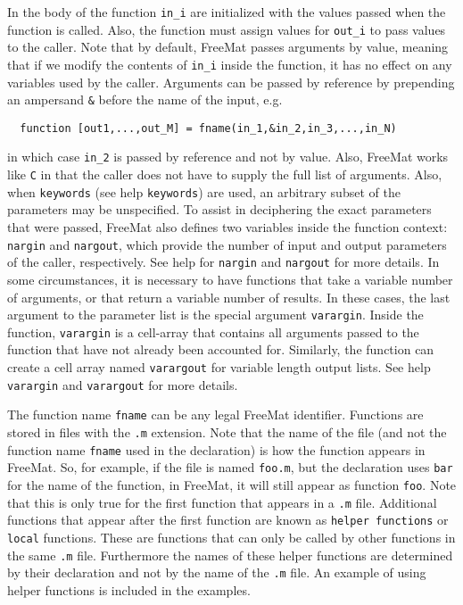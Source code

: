 In the body of the function \verb|in_i| are initialized with the
values passed when the function is called.  Also, the function
must assign values for \verb|out_i| to pass values to the caller.
Note that by default, FreeMat passes arguments by value, meaning
that if we modify the contents of \verb|in_i| inside the function,
it has no effect on any variables used by the caller.  Arguments
can be passed by reference by prepending an ampersand \verb|&|
before the name of the input, e.g.
\begin{verbatim}
  function [out1,...,out_M] = fname(in_1,&in_2,in_3,...,in_N)
\end{verbatim}
in which case \verb|in_2| is passed by reference and not by value.
Also, FreeMat works like \verb|C| in that the caller does not have
to supply the full list of arguments.  Also, when \verb|keywords|
(see help \verb|keywords|) are used, an arbitrary subset of the 
parameters may be unspecified. To assist in deciphering 
the exact parameters that were passed,
FreeMat also defines two variables inside the function context:
\verb|nargin| and \verb|nargout|, which provide the number of input
and output parameters of the caller, respectively. See help for 
\verb|nargin| and \verb|nargout| for more details.  In some 
circumstances, it is necessary to have functions that
take a variable number of arguments, or that return a variable
number of results.  In these cases, the last argument to the 
parameter list is the special argument \verb|varargin|.  Inside
the function, \verb|varargin| is a cell-array that contains
all arguments passed to the function that have not already
been accounted for.  Similarly, the function can create a
cell array named \verb|varargout| for variable length output lists.
See help \verb|varargin| and \verb|varargout| for more details.

The function name \verb|fname| can be any legal FreeMat identifier.
Functions are stored in files with the \verb|.m| extension.  Note
that the name of the file (and not the function name \verb|fname| 
used in the declaration) is how the function appears in FreeMat.
So, for example, if the file is named \verb|foo.m|, but the declaration
uses \verb|bar| for the name of the function, in FreeMat, it will 
still appear as function \verb|foo|.  Note that this is only true
for the first function that appears in a \verb|.m| file.  Additional
functions that appear after the first function are known as
\verb|helper functions| or \verb|local| functions.  These are functions that
can only be called by other functions in the same \verb|.m| file.  Furthermore
the names of these helper functions are determined by their declaration
and not by the name of the \verb|.m| file.  An example of using
helper functions is included in the examples.

